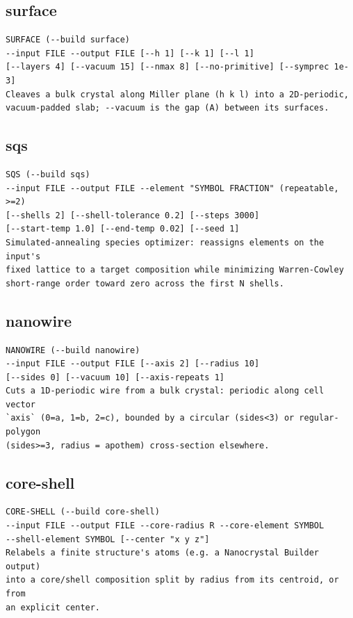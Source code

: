 \clearpage

\subsection{surface}

\begin{lstlisting}
SURFACE (--build surface)
--input FILE --output FILE [--h 1] [--k 1] [--l 1]
[--layers 4] [--vacuum 15] [--nmax 8] [--no-primitive] [--symprec 1e-3]
Cleaves a bulk crystal along Miller plane (h k l) into a 2D-periodic,
vacuum-padded slab; --vacuum is the gap (A) between its surfaces.
\end{lstlisting}

\clearpage

\subsection{sqs}

\begin{lstlisting}
SQS (--build sqs)
--input FILE --output FILE --element "SYMBOL FRACTION" (repeatable, >=2)
[--shells 2] [--shell-tolerance 0.2] [--steps 3000]
[--start-temp 1.0] [--end-temp 0.02] [--seed 1]
Simulated-annealing species optimizer: reassigns elements on the input's
fixed lattice to a target composition while minimizing Warren-Cowley
short-range order toward zero across the first N shells.
\end{lstlisting}

\clearpage

\subsection{nanowire}

\begin{lstlisting}
NANOWIRE (--build nanowire)
--input FILE --output FILE [--axis 2] [--radius 10]
[--sides 0] [--vacuum 10] [--axis-repeats 1]
Cuts a 1D-periodic wire from a bulk crystal: periodic along cell vector
`axis` (0=a, 1=b, 2=c), bounded by a circular (sides<3) or regular-polygon
(sides>=3, radius = apothem) cross-section elsewhere.
\end{lstlisting}

\clearpage

\subsection{core-shell}

\begin{lstlisting}
CORE-SHELL (--build core-shell)
--input FILE --output FILE --core-radius R --core-element SYMBOL
--shell-element SYMBOL [--center "x y z"]
Relabels a finite structure's atoms (e.g. a Nanocrystal Builder output)
into a core/shell composition split by radius from its centroid, or from
an explicit center.
\end{lstlisting}
